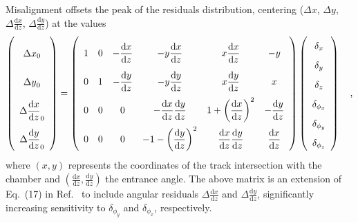 \documentclass[11pt,twoside,a4paper,cmspaper]{cms-tdr}
\begin{document}
Misalignment offsets the peak of the residuals distribution, centering
($\Delta x$, $\Delta y$, $\Delta \frac{\textrm{d}x}{\textrm{d}z}$,
$\Delta \frac{\textrm{d}y}{\textrm{d}z}$) at the values
\begin{equation}
\renewcommand{\arraystretch}{2.5}
\left(\begin{array}{c}
{\Delta x}_0 \\
{\Delta y}_0 \\
{\Delta \dfrac{\textrm{d}x}{\textrm{d}z}}_0 \\
{\Delta \dfrac{\textrm{d}y}{\textrm{d}z}}_0 \\
\end{array}\right)
=
{\renewcommand{\arraystretch}{2.5}
\left(\begin{array}{c c c c c c}
1 & 0 & -\dfrac{\textrm{d}x}{\textrm{d}z} & -y \dfrac{\textrm{d}x}{\textrm{d}z} & x \dfrac{\textrm{d}x}{\textrm{d}z} & -y \\
0 & 1 & -\dfrac{\textrm{d}y}{\textrm{d}z} & -y \dfrac{\textrm{d}y}{\textrm{d}z} & x \dfrac{\textrm{d}y}{\textrm{d}z} & x \\
0 & 0 & 0 & -\dfrac{\textrm{d}x}{\textrm{d}z} \dfrac{\textrm{d}y}{\textrm{d}z} & 1 + \left(\dfrac{\textrm{d}x}{\textrm{d}z}\right)^2 & -\dfrac{\textrm{d}y}{\textrm{d}z} \\
0 & 0 & 0 & -1 - \left(\dfrac{\textrm{d}y}{\textrm{d}z}\right)^2 & \dfrac{\textrm{d}x}{\textrm{d}z}\dfrac{\textrm{d}y}{\textrm{d}z} & \dfrac{\textrm{d}x}{\textrm{d}z}
\end{array}\right)}
\renewcommand{\arraystretch}{1.7}
\left(\begin{array}{c}
\delta_x \\
\delta_y \\
\delta_z \\
\delta_{\phi_x} \\
\delta_{\phi_y} \\
\delta_{\phi_z}
\end{array}\right) \quad\mbox{,}
\label{eqn:dtmatrix}
\end{equation}
where $(x,y)$ represents the coordinates of the track intersection
with the chamber and $(\frac{\textrm{d}x}{\textrm{d}z},\frac{\textrm{d}y}{\textrm{d}z})$ the entrance
angle.  The above matrix is an extension of Eq.~(17) in
Ref.~\cite{Karimaki:2003bd} to include angular residuals
$\Delta \frac{\textrm{d}x}{\textrm{d}z}$ and $\Delta \frac{\textrm{d}y}{\textrm{d}z}$, significantly
increasing sensitivity to $\delta_{\phi_y}$ and $\delta_{\phi_x}$,
respectively.
\end{document}
